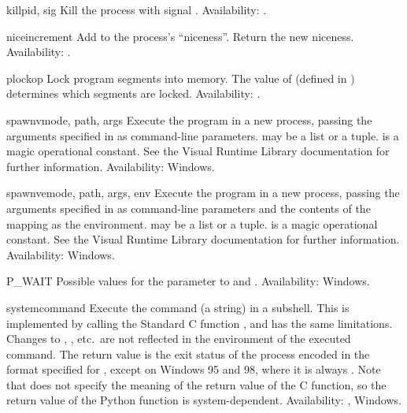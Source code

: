 \begin{funcdesc}{kill}{pid, sig}
Kill the process  with signal .
Availability: \UNIX{}.
\end{funcdesc}

\begin{funcdesc}{nice}{increment}
Add  to the process's ``niceness''.  Return the new
niceness.
Availability: \UNIX{}.
\end{funcdesc}

\begin{funcdesc}{plock}{op}
Lock program segments into memory.  The value of 
(defined in ) determines which segments are locked.
Availability: \UNIX{}.
\end{funcdesc}

\begin{funcdesc}{spawnv}{mode, path, args}
Execute the program  in a new process, passing the arguments 
specified in  as command-line parameters.   may be 
a list or a tuple.   is a magic operational constant.  See
the Visual \Cpp{} Runtime Library documentation for further
information.
Availability: Windows.
\end{funcdesc}

\begin{funcdesc}{spawnve}{mode, path, args, env}
Execute the program  in a new process, passing the arguments 
specified in  as command-line parameters and the contents of 
the mapping  as the environment.   may be a list or
a tuple.   is a magic operational constant.  See the Visual
\Cpp{} Runtime Library documentation for further information.
Availability: Windows.
\end{funcdesc}

\begin{datadesc}{P_WAIT}
Possible values for the  parameter to 
and .
Availability: Windows.
\end{datadesc}

\begin{funcdesc}{system}{command}
Execute the command (a string) in a subshell.  This is implemented by
calling the Standard C function , and has the
same limitations.  Changes to , ,
etc.\ are not reflected in the environment of the executed command.
The return value is the exit status of the process encoded in the
format specified for , except on Windows 95 and 98,
where it is always .  Note that \POSIX{} does not specify the
meaning of the return value of the C  function,
so the return value of the Python function is system-dependent.
Availability: \UNIX{}, Windows.
\end{funcdesc}

